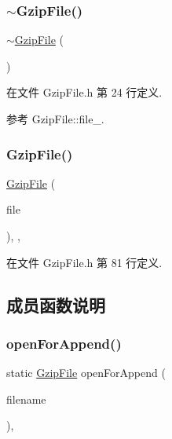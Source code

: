 \subsubsection{\texorpdfstring{$\sim$\+Gzip\+File()}{~GzipFile()}}
{\footnotesize\ttfamily $\sim$\hyperlink{classmuduo_1_1GzipFile}{Gzip\+File} (\begin{DoxyParamCaption}{ }\end{DoxyParamCaption})\hspace{0.3cm}{\ttfamily [inline]}}



在文件 Gzip\+File.\+h 第 24 行定义.



参考 Gzip\+File\+::file\+\_\+.

\mbox{\label{classmuduo_1_1GzipFile_ab4b83a7add3f1901e7e4e0722fdd8f35}} 
\subsubsection{\texorpdfstring{Gzip\+File()}{GzipFile()}\hspace{0.1cm}{\footnotesize\ttfamily [2/2]}}
{\footnotesize\ttfamily \hyperlink{classmuduo_1_1GzipFile}{Gzip\+File} (\begin{DoxyParamCaption}\item[{gz\+File}]{file }\end{DoxyParamCaption})\hspace{0.3cm}{\ttfamily [inline]}, {\ttfamily [explicit]}, {\ttfamily [private]}}



在文件 Gzip\+File.\+h 第 81 行定义.



\subsection{成员函数说明}
\mbox{\label{classmuduo_1_1GzipFile_a9c729746e69ca041b116552594ddb70a}} 
\subsubsection{\texorpdfstring{open\+For\+Append()}{openForAppend()}}
{\footnotesize\ttfamily static \hyperlink{classmuduo_1_1GzipFile}{Gzip\+File} open\+For\+Append (\begin{DoxyParamCaption}\item[{\hyperlink{classmuduo_1_1StringArg}{String\+Arg}}]{filename }\end{DoxyParamCaption})\hspace{0.3cm}{\ttfamily [inline]}, {\ttfamily [static]}}



